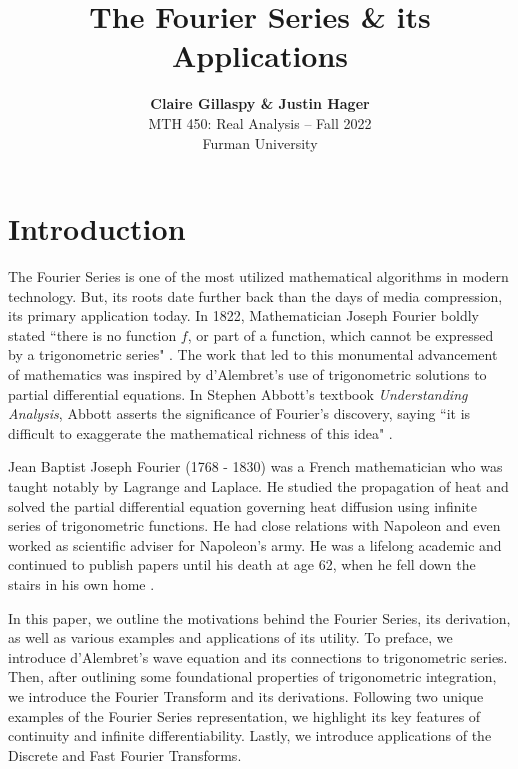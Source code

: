 \documentclass[11pt]{amsart}
\theoremstyle{plain}
\theoremstyle{definition}
\begin{document}
\title{\vspace{-5ex}\textbf{The Fourier Series \& its Applications}}
\author{\textbf{Claire Gillaspy \& Justin Hager}\\MTH 450: Real Analysis -- Fall 2022\\Furman University}
\date{}

\maketitle
\thispagestyle{empty}
\section{Introduction}
The Fourier Series is one of the most utilized mathematical algorithms in modern technology. But, its roots date further back than the days of media compression, its primary application today. In 1822, Mathematician Joseph Fourier boldly stated ``there is no function $f$, or part of a function, which cannot be expressed by a trigonometric series" \cite{Fourier}. The work that led to this monumental advancement of mathematics was inspired by d'Alembret's use of trigonometric solutions to partial differential equations. In Stephen Abbott's textbook \textit{Understanding Analysis}, Abbott asserts the significance of Fourier's discovery, saying ``it is difficult to exaggerate the mathematical richness of this idea" \cite{Abbott}. 

Jean Baptist Joseph Fourier (1768 - 1830) was a French mathematician who was taught notably by Lagrange and Laplace. He studied the propagation of heat and solved the partial differential equation governing heat diffusion using infinite series of trigonometric functions. He had close relations with Napoleon and even worked as scientific adviser for Napoleon's army. He was a lifelong academic and continued to publish papers until his death at age 62, when he fell down the stairs in his own home \cite{Biography}.

In this paper, we outline the motivations behind the Fourier Series, its derivation, as well as various examples and applications of its utility. To preface, we introduce d'Alembret's wave equation and its connections to trigonometric series. Then, after outlining some foundational properties of trigonometric integration, we introduce the Fourier Transform and its derivations. Following two unique examples of the Fourier Series representation, we highlight its key features of continuity and infinite differentiability. Lastly, we introduce applications of the Discrete and Fast Fourier Transforms.
\end{document}
